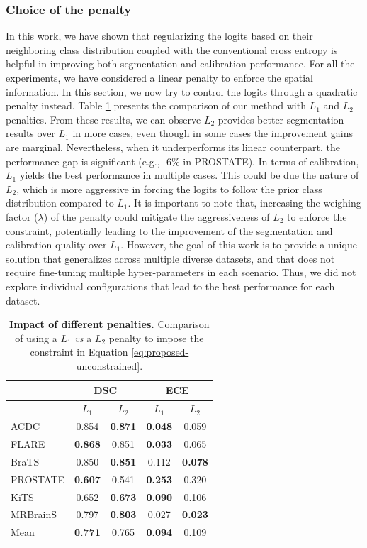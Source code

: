 \documentclass[twocolumn,final,10pt]{elsarticle}
\newcommand{\rev}[1]{{\color{black}#1}}
\begin{document}
\subsubsection{Choice of the penalty}
\rev{In this work, we have shown that regularizing the logits based on their neighboring class distribution coupled with the conventional cross entropy is helpful in improving both segmentation and calibration performance. For all the experiments, we have considered a linear penalty to enforce the spatial information. In this section, we now try to control the logits through a quadratic penalty instead. Table \ref{table:l1-l2penalty} presents the comparison of our method with $L_1$ and $L_2$ penalties. From these results, we can observe $L_2$ provides better segmentation results over $L_1$ in more cases, even though in some cases the improvement gains are marginal. Nevertheless, when it underperforms its linear counterpart, the performance gap is significant (e.g., -6\% in PROSTATE). In terms of calibration, $L_1$ yields the best performance in multiple cases. This could be due the nature of $L_2$, which is more aggressive in forcing the logits to follow the prior class distribution compared to $L_1$. It is important to note that, increasing the weighing factor ($\lambda$) of the penalty could mitigate the aggressiveness of $L_2$ to enforce the constraint, potentially leading to the improvement of the segmentation and calibration quality over $L_1$. However, the goal of this work is to provide a unique solution that generalizes across multiple diverse datasets, and that does not require fine-tuning multiple hyper-parameters in each scenario. Thus, we did not explore individual configurations that lead to the best performance for each dataset.}


\begin{table}[h!]
\centering
\footnotesize
\begin{tabular}{l|cc|cc}
\toprule
& \multicolumn{2}{c|}{DSC}  & \multicolumn{2}{c}{ECE} \\
\midrule
& $L_1$ & $L_2$ & $L_1$ & $L_2$ \\
\midrule
ACDC & 0.854 & \textbf{0.871} & \textbf{0.048} & 0.059 \\
FLARE & \textbf{0.868} & 0.851 & \textbf{0.033} & 0.065 \\
BraTS & 0.850 & \textbf{0.851} & 0.112 & \textbf{0.078} \\
\rev{PROSTATE} & \rev{\textbf{0.607}} & \rev{0.541} & \rev{\textbf{0.253}} & \rev{0.320} \\
\rev{KiTS} & \rev{0.652} & \rev{\textbf{0.673}} & \rev{\textbf{0.090}} & \rev{0.106} \\
\rev{MRBrainS} & \rev{0.797} & \rev{\textbf{0.803}} & \rev{0.027} & \rev{\textbf{0.023}} \\ 
\midrule
\rev{Mean} & \rev{\textbf{0.771}} & \rev{0.765} & \rev{\textbf{0.094}} & \rev{0.109} \\ \bottomrule
\end{tabular}
\caption{\textbf{\rev{Impact of different penalties.}} \rev{Comparison of using a $L_1$ \textit{vs} a $L_2$ penalty to impose the constraint in Equation \ref{eq:proposed-unconstrained}.}}
\label{table:l1-l2penalty}
\end{table}
\end{document}
